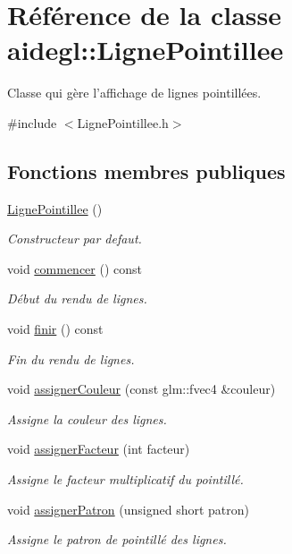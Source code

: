 \hypertarget{classaidegl_1_1_ligne_pointillee}{\section{Référence de la classe aidegl\-:\-:Ligne\-Pointillee}
\label{classaidegl_1_1_ligne_pointillee}
}


Classe qui gère l'affichage de lignes pointillées.  




{\ttfamily \#include $<$Ligne\-Pointillee.\-h$>$}

\subsection*{Fonctions membres publiques}
\begin{DoxyCompactItemize}
\item 
\hyperlink{classaidegl_1_1_ligne_pointillee_a4fc590690c8bbc7368fb355a71d5eaf2}{Ligne\-Pointillee} ()
\begin{DoxyCompactList}\small\item\em Constructeur par defaut. \end{DoxyCompactList}\item 
void \hyperlink{classaidegl_1_1_ligne_pointillee_a455e3f5a717d72b04808c90c3d20f23f}{commencer} () const 
\begin{DoxyCompactList}\small\item\em Début du rendu de lignes. \end{DoxyCompactList}\item 
void \hyperlink{classaidegl_1_1_ligne_pointillee_a5a1522b90f6970b3a33103935bed74da}{finir} () const 
\begin{DoxyCompactList}\small\item\em Fin du rendu de lignes. \end{DoxyCompactList}\item 
void \hyperlink{classaidegl_1_1_ligne_pointillee_a73fc1d54bcd3afd2861ea81a8b3721d0}{assigner\-Couleur} (const glm\-::fvec4 \&couleur)
\begin{DoxyCompactList}\small\item\em Assigne la couleur des lignes. \end{DoxyCompactList}\item 
void \hyperlink{classaidegl_1_1_ligne_pointillee_a0d9e3b0ca2604f1e9410b868a8917a78}{assigner\-Facteur} (int facteur)
\begin{DoxyCompactList}\small\item\em Assigne le facteur multiplicatif du pointillé. \end{DoxyCompactList}\item 
void \hyperlink{classaidegl_1_1_ligne_pointillee_a2eb75fea1bec5566ca4feae3612d7b5e}{assigner\-Patron} (unsigned short patron)
\begin{DoxyCompactList}\small\item\em Assigne le patron de pointillé des lignes. \end{DoxyCompactList}\end{DoxyCompactItemize}


